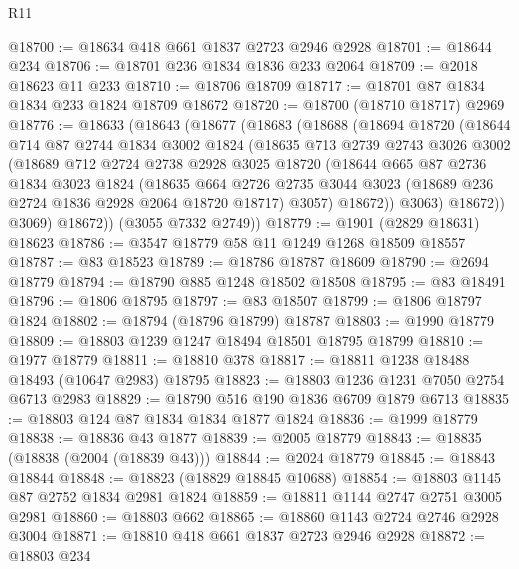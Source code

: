 \begin{lexlean}{R11}
\begin{coremodule}
@18700 := @18634 @418 @661 @1837 @2723 @2946 @2928
@18701 := @18644 @234
@18706 := @18701 @236 @1834 @1836 @233 @2064
@18709 := @2018 @18623 @11 @233
@18710 := @18706 @18709
@18717 := @18701 @87 @1834 @1834 @233 @1824 @18709 @18672
@18720 := @18700 (@18710 @18717) @2969
@18776 := @18633
    (@18643
      (@18677
        (@18683
          (@18688
            (@18694
              @18720
              (@18644
                @714
                @87
                @2744
                @1834
                @3002
                @1824
                (@18635
                  @713
                  @2739
                  @2743
                  @3026
                  @3002
                  (@18689
                    @712
                    @2724
                    @2738
                    @2928
                    @3025
                    @18720
                    (@18644
                      @665
                      @87
                      @2736
                      @1834
                      @3023
                      @1824
                      (@18635
                        @664
                        @2726
                        @2735
                        @3044
                        @3023
                        (@18689 @236 @2724 @1836 @2928 @2064 @18720 @18717)
                        @3057)
                      @18672))
                  @3063)
                @18672))
            @3069)
          @18672))
      (@3055 @7332 @2749))
@18779 := @1901 (@2829 @18631) @18623
@18786 := @3547 @18779 @58 @11 @1249 @1268 @18509 @18557
@18787 := @83 @18523
@18789 := @18786 @18787 @18609
@18790 := @2694 @18779
@18794 := @18790 @885 @1248 @18502 @18508
@18795 := @83 @18491
@18796 := @1806 @18795
@18797 := @83 @18507
@18799 := @1806 @18797 @1824
@18802 := @18794 (@18796 @18799) @18787
@18803 := @1990 @18779
@18809 := @18803 @1239 @1247 @18494 @18501 @18795 @18799
@18810 := @1977 @18779
@18811 := @18810 @378
@18817 := @18811 @1238 @18488 @18493 (@10647 @2983) @18795
@18823 := @18803 @1236 @1231 @7050 @2754 @6713 @2983
@18829 := @18790 @516 @190 @1836 @6709 @1879 @6713
@18835 := @18803 @124 @87 @1834 @1834 @1877 @1824
@18836 := @1999 @18779
@18838 := @18836 @43 @1877
@18839 := @2005 @18779
@18843 := @18835 (@18838 (@2004 (@18839 @43)))
@18844 := @2024 @18779
@18845 := @18843 @18844
@18848 := @18823 (@18829 @18845 @10688)
@18854 := @18803 @1145 @87 @2752 @1834 @2981 @1824
@18859 := @18811 @1144 @2747 @2751 @3005 @2981
@18860 := @18803 @662
@18865 := @18860 @1143 @2724 @2746 @2928 @3004
@18871 := @18810 @418 @661 @1837 @2723 @2946 @2928
@18872 := @18803 @234

\end{coremodule}
\end{lexlean}
